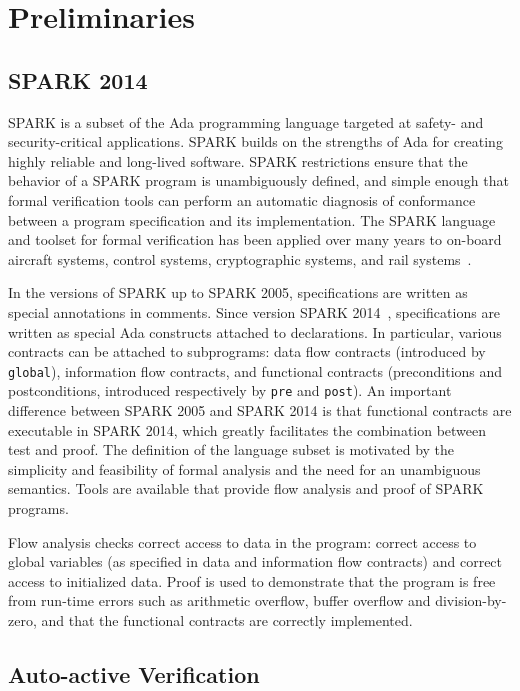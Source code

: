 \documentclass{llncs}
\newcommand{\spark}{SPARK\xspace}
\begin{document}
\section{Preliminaries}
\subsection{\spark 2014}

\spark is a subset of the Ada programming language targeted at safety-
and security-critical applications. \spark builds on the strengths of
Ada for creating highly reliable and long-lived software. \spark
restrictions ensure that the behavior of a \spark program is
unambiguously defined, and simple enough that formal verification
tools can perform an automatic diagnosis of conformance between a
program specification and its implementation. The \spark language and
toolset for formal verification has been applied over many years to
on-board aircraft systems, control systems, cryptographic systems, and
rail systems~\cite{sparkbook2012,oneill2012}.

In the versions of \spark up to \spark 2005, specifications are written as
special annotations in comments. Since version \spark 2014~\cite{sparkERTS2014},
specifications are written as special Ada constructs attached to
declarations. In particular, various contracts can be attached to subprograms:
data flow contracts (introduced by \texttt{global}), information flow
contracts, and functional contracts (preconditions and postconditions,
introduced respectively by \texttt{pre} and \texttt{post}). An important
difference between \spark 2005 and \spark 2014 is that functional contracts are
executable in \spark 2014, which greatly facilitates the combination between
test and proof. The definition of the language subset is motivated by the
simplicity and feasibility of formal analysis and the need for an unambiguous
semantics. Tools are available that provide flow analysis and proof of \spark
programs.

Flow analysis checks correct access to data in the program: correct access to
global variables (as specified in data and information flow contracts) and
correct access to initialized data. Proof is used to demonstrate that the
program is free from run-time errors such as arithmetic overflow, buffer
overflow and division-by-zero, and that the functional contracts are correctly
implemented.

\subsection{Auto-active Verification}
\label{sec-prelim-auto-active}
\end{document}
